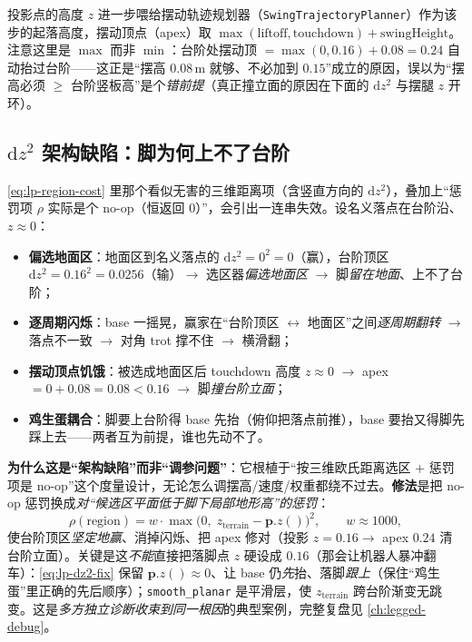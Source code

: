 投影点的高度 $z$ 进一步喂给摆动轨迹规划器（\texttt{SwingTrajectoryPlanner}）作为该步的起落高度，摆动顶点（apex）取 $\max(\text{liftoff},\text{touchdown})+\text{swingHeight}$。注意这里是 $\max$ 而非 $\min$：台阶处摆动顶 $=\max(0,0.16)+0.08=0.24$ 自动抬过台阶——这正是“摆高 $0.08\,$m 就够、不必加到 $0.15$”成立的原因，误以为“摆高必须 $\ge$ 台阶竖板高”是个\emph{错前提}（真正撞立面的原因在下面的 $\mathrm{d}z^2$ 与摆腿 $z$ 开环）。

\subsection{\texorpdfstring{$\mathrm{d}z^2$}{dz2} 架构缺陷：脚为何上不了台阶}
\label{subsec:lp-dz2}

\begin{pitfall}\label{pit:lp-dz2}
\cref{eq:lp-region-cost} 里那个看似无害的三维距离项（含竖直方向的 $\mathrm{d}z^2$），叠加上“惩罚项 $\rho$ 实际是个 no-op（恒返回 $0$）”，会引出一连串失效。设名义落点在台阶沿、$z\approx 0$：
\begin{itemize}
  \item \textbf{偏选地面区}：地面区到名义落点的 $\mathrm{d}z^2=0^2=0$（赢），台阶顶区 $\mathrm{d}z^2=0.16^2=0.0256$（输）$\to$ 选区器\emph{偏选地面区} $\to$ 脚\emph{留在地面}、上不了台阶；
  \item \textbf{逐周期闪烁}：base 一摇晃，赢家在“台阶顶区 $\leftrightarrow$ 地面区”之间\emph{逐周期翻转} $\to$ 落点不一致 $\to$ 对角 trot 撑不住 $\to$ 横滑翻；
  \item \textbf{摆动顶点饥饿}：被选成地面区后 touchdown 高度 $z\approx 0$ $\to$ apex $=0+0.08=0.08<0.16$ $\to$ 脚\emph{撞台阶立面}；
  \item \textbf{鸡生蛋耦合}：脚要上台阶得 base 先抬（俯仰把落点前推），base 要抬又得脚先踩上去——两者互为前提，谁也先动不了。
\end{itemize}
\textbf{为什么这是“架构缺陷”而非“调参问题”}：它根植于“按三维欧氏距离选区 + 惩罚项是 no-op”这个度量设计，无论怎么调摆高/速度/权重都绕不过去。\textbf{修法}是把 no-op 惩罚换成\emph{对“候选区平面低于脚下局部地形高”的惩罚}：
\begin{equation}
  \rho(\text{region}) = w\cdot \max\!\big(0,\; z_{\mathrm{terrain}}-\mathbf{p}.z()\big)^2,\qquad w\approx 1000,
  \label{eq:lp-dz2-fix}
\end{equation}
使台阶顶区\emph{坚定地赢}、消掉闪烁、把 apex 修对（投影 $z=0.16\to$ apex $0.24$ 清台阶立面）。关键是这\emph{不能}直接把落脚点 $z$ 硬设成 $0.16$（那会让机器人暴冲翻车）：\cref{eq:lp-dz2-fix} 保留 $\mathbf{p}.z()\approx 0$、让 base 仍\emph{先}抬、落脚\emph{跟上}（保住“鸡生蛋”里正确的先后顺序）；\texttt{smooth\_planar} 是平滑层，使 $z_{\mathrm{terrain}}$ 跨台阶渐变无跳变。这是\emph{多方独立诊断收束到同一根因}的典型案例，完整复盘见 \cref{ch:legged-debug}。
\end{pitfall}

